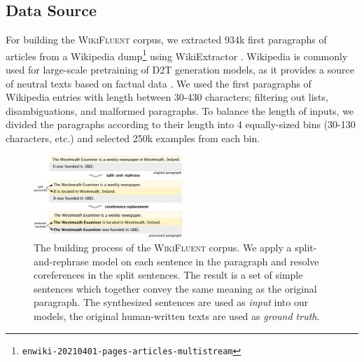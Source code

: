
\subsection{Data Source} For building the \textsc{WikiFluent} corpus, we extracted 934k first paragraphs of articles from a Wikipedia dump\footnote{\texttt{enwiki-20210401-pages-articles-multistream}} using WikiExtractor \cite{Wikiextractor2015}. Wikipedia is commonly used for large-scale pretraining of D2T generation models, as it provides a source of neutral texts based on factual data \cite{jinGenWikiDatasetMillion2020,chenKGPTKnowledgeGroundedPreTraining2020}.
We used the first paragraphs of Wikipedia entries with length between 30-430 characters; filtering out lists, disambiguations, and malformed paragraphs. To balance the length of inputs, we divided the paragraphs according to their length into 4 equally-sized bins (30-130 characters, etc.) and selected 250k examples from each bin.



\begin{figure}[t]
    \centering
    \includegraphics[width=0.5\textwidth]{img/wikifluent.pdf}
    \caption{The building process of the \textsc{WikiFluent} corpus. We apply a split-and-rephrase model on each sentence in the paragraph and resolve coreferences in the split sentences. The result is a set of simple sentences which together convey the same meaning as the original paragraph. The synthesized sentences are used as \textit{input} into our models, the original human-written texts are used as \textit{ground truth}.}\label{fig:wikifluent}
\end{figure}


